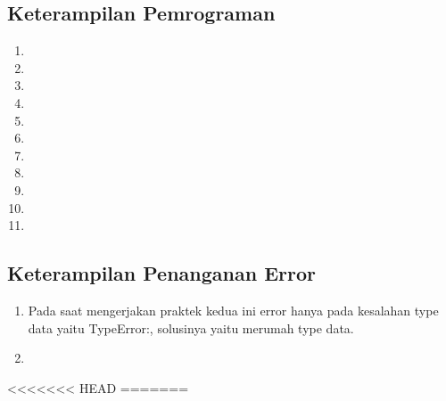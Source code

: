 \subsection{Keterampilan Pemrograman}
\begin{enumerate}
    \item 
    
    \item 
    
    \item 
    
    \item 
    
    \item 
    
    \item 
    
    \item 
    
    \item 
    
    \item 
    
    \item 
    
    \item 
    
\end{enumerate}

\subsection{Keterampilan Penanganan Error}
\begin{enumerate}
    \item Pada saat mengerjakan praktek kedua ini error hanya pada kesalahan type data yaitu TypeError:, solusinya yaitu merumah type data.
    
    \item 
    
\end{enumerate}
<<<<<<< HEAD
=======

